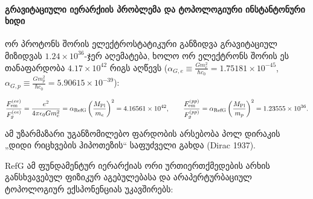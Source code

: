 \documentclass[11pt,a4paper]{article}
\begin{document}
\paragraph{გრავიტაციული იერარქიის პრობლემა და ტოპოლოგიური ინსტანტონური ხიდი}

ორ პროტონს შორის ელექტროსტატიკური განზიდვა გრავიტაციულ მიზიდვას $1.24\times 10^{36}$-ჯერ აღემატება, ხოლო ორ ელექტრონს შორის ეს თანაფარდობა $4.17\times 10^{42}$ რიგს აღწევს ($\alpha_{G,e} \equiv \frac{G m_e^2}{\hbar c_0} = 1.75181\times 10^{-45}$, $\alpha_{G,p} \equiv \frac{G m_p^2}{\hbar c_0} = 5.90615\times 10^{-39}$):

\[
\frac{F_{\rm em}^{(ee)}}{F_g^{(ee)}} = \frac{e^2}{4\pi\epsilon_0 G m_e^2} = \alpha_{\rm RefG} \left(\frac{M_{\rm Pl}}{m_e}\right)^2 = 4.16561 \times 10^{42}, \qquad \frac{F_{\rm em}^{(pp)}}{F_g^{(pp)}} = \alpha_{\rm RefG} \left(\frac{M_{\rm Pl}}{m_p}\right)^2 = 1.23555 \times 10^{36}.
\]

ამ უზარმაზარი უგანზომილებო ფარდობის არსებობა პოლ დირაკის „დიდი რიცხვების ჰიპოთეზის“ საფუძველი გახდა (Dirac 1937).

RefG ამ ფუნდამენტურ იერარქიას ორი ურთიერთქმედების არხის განსხვავებულ ფიზიკურ აგებულებასა და არაპერტურბაციულ ტოპოლოგიურ ექსპონენციას უკავშირებს:
\end{document}
